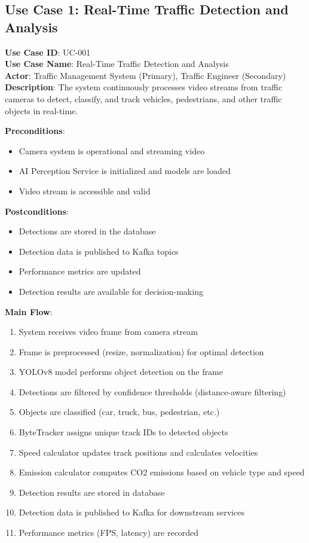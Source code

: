 \documentclass[12pt,a4paper]{article}
\begin{document}
\subsection{Use Case 1: Real-Time Traffic Detection and Analysis}

\textbf{Use Case ID}: UC-001 \\
\textbf{Use Case Name}: Real-Time Traffic Detection and Analysis \\
\textbf{Actor}: Traffic Management System (Primary), Traffic Engineer (Secondary) \\
\textbf{Description}: The system continuously processes video streams from traffic cameras to detect, classify, and track vehicles, pedestrians, and other traffic objects in real-time.

\textbf{Preconditions}:
\begin{itemize}
    \item Camera system is operational and streaming video
    \item AI Perception Service is initialized and models are loaded
    \item Video stream is accessible and valid
\end{itemize}

\textbf{Postconditions}:
\begin{itemize}
    \item Detections are stored in the database
    \item Detection data is published to Kafka topics
    \item Performance metrics are updated
    \item Detection results are available for decision-making
\end{itemize}

\textbf{Main Flow}:
\begin{enumerate}
    \item System receives video frame from camera stream
    \item Frame is preprocessed (resize, normalization) for optimal detection
    \item YOLOv8 model performs object detection on the frame
    \item Detections are filtered by confidence thresholds (distance-aware filtering)
    \item Objects are classified (car, truck, bus, pedestrian, etc.)
    \item ByteTracker assigns unique track IDs to detected objects
    \item Speed calculator updates track positions and calculates velocities
    \item Emission calculator computes CO2 emissions based on vehicle type and speed
    \item Detection results are stored in database
    \item Detection data is published to Kafka for downstream services
    \item Performance metrics (FPS, latency) are recorded
\end{enumerate}
\end{document}

